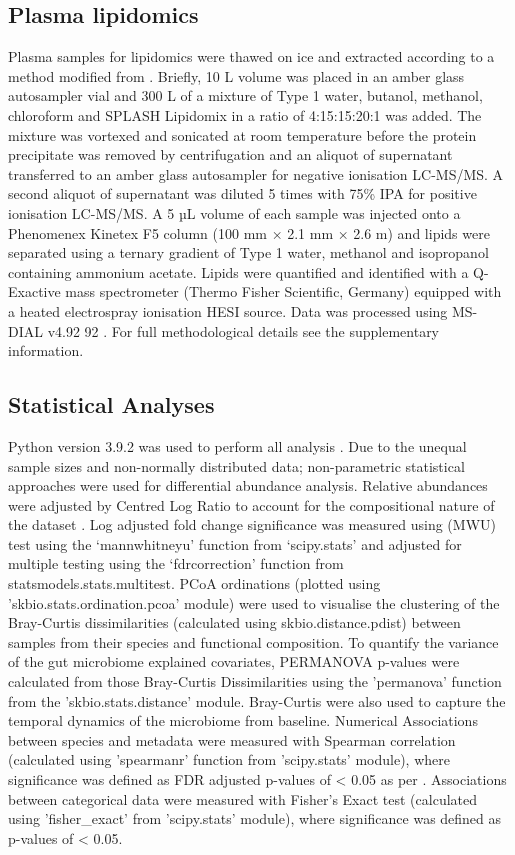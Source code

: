 \documentclass{article}
\begin{document}
\subsection{Plasma lipidomics}
Plasma samples for lipidomics were thawed on ice and extracted according to a method modified from \citet{liu2016plasma}.
Briefly, 10 \textmu{}L volume was placed in an amber glass autosampler vial and 300 \textmu{}L of a mixture of Type 1 water, butanol, methanol, chloroform and SPLASH Lipidomix in a ratio of 4:15:15:20:1 was added.
The mixture was vortexed and sonicated at room temperature before the protein precipitate was removed by centrifugation and an aliquot of supernatant transferred to an amber glass autosampler for negative ionisation LC-MS/MS.
A second aliquot of supernatant was diluted 5 times with 75\% IPA for positive ionisation LC-MS/MS.
A 5 µL volume of each sample was injected onto a Phenomenex Kinetex F5 column (100 mm × 2.1 mm × 2.6 \textmu{}m) and lipids were separated using a ternary gradient of Type 1 water, methanol and isopropanol containing ammonium acetate.
Lipids were quantified and identified with a Q-Exactive mass spectrometer (Thermo Fisher Scientific, Germany) equipped with a heated electrospray ionisation HESI source.
Data was processed using MS-DIAL v4.92 92 \cite{tsugawa2015ms}.
For full methodological details see the supplementary information.

\subsection{Statistical Analyses}
Python version 3.9.2 was used to perform all analysis \cite{van1995python}.
Due to the unequal sample sizes and non-normally distributed data; non-parametric statistical approaches were used for differential abundance analysis.
Relative abundances were adjusted by Centred Log Ratio to account for the compositional nature of the dataset \cite{gloor2016s}.
Log adjusted fold change significance was measured using (MWU) test using the ‘mannwhitneyu’ function from ‘scipy.stats’ and adjusted for multiple testing using the ‘fdrcorrection’ function from statsmodels.stats.multitest.
PCoA ordinations (plotted using 'skbio.stats.ordination.pcoa' module) were used to visualise the clustering of the Bray-Curtis dissimilarities (calculated using skbio.distance.pdist) between samples from their species and functional composition.
To quantify the variance of the gut microbiome explained covariates, PERMANOVA p-values were calculated from those Bray-Curtis Dissimilarities using the ’permanova’ function from the 'skbio.stats.distance' module.
Bray-Curtis were also used to capture the temporal dynamics of the microbiome from baseline.
Numerical Associations between species and metadata were measured with Spearman correlation (calculated using 'spearmanr' function from 'scipy.stats' module), where significance was defined as FDR adjusted p-values of \textless{} 0.05 as per \citet{2020SciPyNMeth}.
Associations between categorical data were measured with Fisher's Exact test (calculated using 'fisher\_exact' from 'scipy.stats' module), where significance was defined as p-values of \textless{} 0.05.
\end{document}
